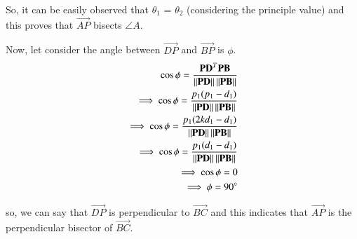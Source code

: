\documentclass[journal,12pt,twocolumn]{IEEEtran}
\renewcommand\thesection{\arabic{section}}
\begin{document}
So, it can be easily observed that $\theta_1$ = $\theta_2$ (considering the principle value) and this proves that $\vec{AP}$ bisects $\angle A$.

Now, let consider the angle between $\vec{DP}$ and $\vec{BP}$ is $\phi$.
\begin{align}
\cos\phi = \frac{\mathbf{PD}^T \mathbf{PB}}{\left\lVert\mathbf{PD}\right\rVert\left\lVert\mathbf{PB}\right\rVert}\\
\implies \cos\phi = \frac{p_1(p_1 - d_1)}{\left\lVert\mathbf{PD}\right\rVert\left\lVert\mathbf{PB}\right\rVert}\\
\implies \cos\phi = \frac{p_1(2kd_1 - d_1)}{\left\lVert\mathbf{PD}\right\rVert\left\lVert\mathbf{PB}\right\rVert}\\
\implies \cos\phi = \frac{p_1(d_1 - d_1)}{\left\lVert\mathbf{PD}\right\rVert\left\lVert\mathbf{PB}\right\rVert}\\
\implies \cos\phi = 0\\
\implies \phi = 90 \degree
\end{align}

so, we can say that $\vec{DP}$ is perpendicular to $\vec{BC}$ and this indicates that $\vec{AP}$ is the perpendicular bisector of $\vec{BC}$.
\renewcommand{\theequation}{\theenumi}
%
\end{document}
